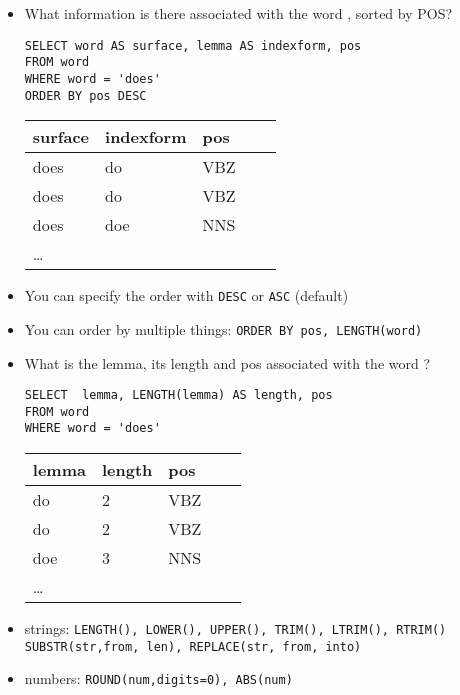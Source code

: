 \documentclass[a4paper,landscape,headrule,footrule,xetex]{foils}
\begin{document}

\begin{itemize}\addtolength{\itemsep}{-1ex}
\item What information is there associated with the word , sorted by POS?
\begin{verbatim}
SELECT word AS surface, lemma AS indexform, pos
FROM word
WHERE word = 'does'
ORDER BY pos DESC
\end{verbatim}
  \begin{tabular}{lllll}
    \textbf{surface}  & \textbf{indexform}  &  \textbf{pos} \\ \hline
    does & do  & VBZ \\
    does & do  & VBZ \\
    does & doe & NNS \\
    \ldots
  \end{tabular}
\item You can specify the order with \texttt{DESC} or \texttt{ASC} (default)
\item You can order by multiple things: \texttt{ORDER BY pos, LENGTH(word)}
\end{itemize}


\begin{itemize}\addtolength{\itemsep}{-1ex}
\item What is the lemma, its length and pos associated with the word ?
\begin{verbatim}
SELECT  lemma, LENGTH(lemma) AS length, pos
FROM word
WHERE word = 'does'
\end{verbatim}
  \begin{tabular}{lllll}
    \textbf{lemma}  & \textbf{length}  &  \textbf{pos} \\ \hline
    do  & 2 &  VBZ \\
    do  & 2 &  VBZ \\
    doe & 3 &  NNS \\
    \ldots
  \end{tabular}
\item strings:  \texttt{LENGTH(), LOWER(), UPPER(), TRIM(), LTRIM(),
    RTRIM()}
  \\ \texttt{SUBSTR(str,from, len), REPLACE(str, from, into)}
\item numbers:  \texttt{ROUND(num,digits=0), ABS(num)}
\end{itemize}

\end{document}
